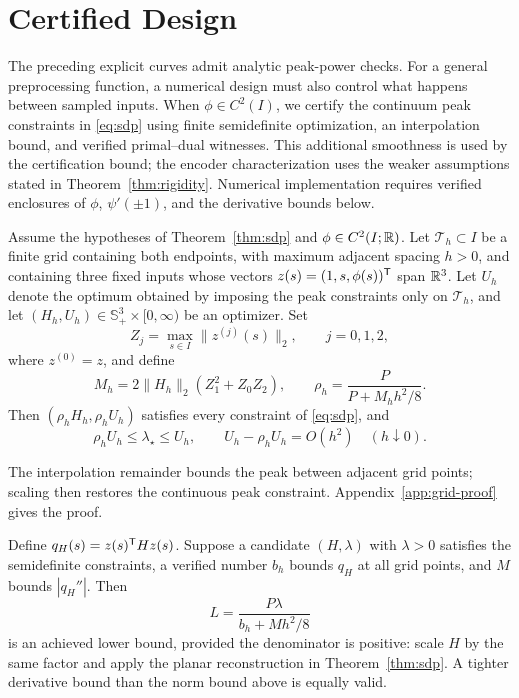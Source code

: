 \section{Certified Design}\label{sec:certified}
The preceding explicit curves admit analytic peak-power checks. For a general preprocessing function, a numerical design must also control what happens between sampled inputs. When $\phi\in C^2(I)$, we certify the continuum peak constraints in \eqref{eq:sdp} using finite semidefinite optimization, an interpolation bound, and verified primal--dual witnesses. This additional smoothness is used by the certification bound; the encoder characterization uses the weaker assumptions stated in Theorem~\ref{thm:rigidity}. Numerical implementation requires verified enclosures of $\phi$, $\psi'(\pm1)$, and the derivative bounds below.

\begin{theorem}\label{thm:certifiedgrid}
Assume the hypotheses of Theorem~\ref{thm:sdp} and $\phi\in C^2(I;\mathbb R)$. Let $\mathcal T_h\subset I$ be a finite grid containing both endpoints, with maximum adjacent spacing $h>0$, and containing three fixed inputs whose vectors $z(s)=(1,s,\phi(s))^\mathsf T$ span $\mathbb R^3$. Let $U_h$ denote the optimum obtained by imposing the peak constraints only on $\mathcal T_h$, and let $(H_h,U_h)\in\mathbb S_+^3\times[0,\infty)$ be an optimizer. Set
$$
 Z_j=\max_{s\in I}\|z^{(j)}(s)\|_2,\qquad j=0,1,2,
$$
where $z^{(0)}=z$, and define
$$
 M_h=2\|H_h\|_2(Z_1^2+Z_0Z_2),\qquad
 \rho_h=\frac{P}{P+M_hh^2/8}.
$$
Then $(\rho_h H_h,\rho_h U_h)$ satisfies every constraint of \eqref{eq:sdp}, and
\begin{equation}
 \rho_h U_h\le\lambda_\star\le U_h,
 \qquad U_h-\rho_h U_h=O(h^2)\quad(h\downarrow0).
 \label{eq:certifiedgrid}
\end{equation}
\end{theorem}
The interpolation remainder bounds the peak between adjacent grid points; scaling then restores the continuous peak constraint. Appendix~\ref{app:grid-proof} gives the proof.

Define $q_H(s)=z(s)^\mathsf T Hz(s)$. Suppose a candidate $(H,\lambda)$ with $\lambda>0$ satisfies the semidefinite constraints, a verified number $b_h$ bounds $q_H$ at all grid points, and $M$ bounds $|q_H''|$. Then
$$
 L=\frac{P\lambda}{b_h+Mh^2/8}
$$
is an achieved lower bound, provided the denominator is positive: scale $H$ by the same factor and apply the planar reconstruction in Theorem~\ref{thm:sdp}. A tighter derivative bound than the norm bound above is equally valid.

